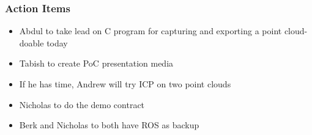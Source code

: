 		\subsubsection*{Action Items}
			\begin{itemize}
				\item Abdul to take lead on C program for capturing and exporting a point cloud- doable today
				\item Tabish to create PoC presentation media
				\item If he has time, Andrew will try ICP on two point clouds
				\item Nicholas to do the demo contract
				\item Berk and Nicholas to both have ROS as backup
			\end{itemize}


